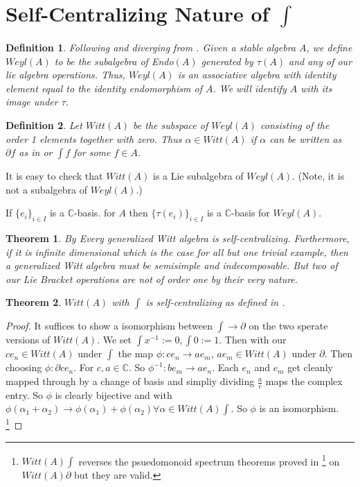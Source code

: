 \documentclass[10pt, oneside]{article}
\newcommand{\C}{\mathbb{C}}
\newtheorem{thm}{Theorem}
\newtheorem{defn}{Definition}
\begin{document}
\section{Self-Centralizing Nature of $\int$}
\begin{defn}
Following \cite{pakianathan2010generalizedwittalgebrasvariable} and diverging from \cite{Dokovic1998}. Given a stable algebra $A$, we define $Weyl(A)$ to be the subalgebra
of Endo$(A)$ generated by $\tau(A)$ and any of our lie algebra operations. Thus,
$Weyl(A)$ is an associative algebra with identity element equal to 
the identity endomorphism of $A$. We will identify $A$ with its image under $\tau$.
\end{defn}
\begin{defn}
Let $Witt(A)$ be the subspace of $Weyl(A)$ consisting of the order 1 elements
together with zero. Thus $\alpha \in Witt(A)$ if $\alpha$ can be written
as $\partial f$ as in \cite{pakianathan2010generalizedwittalgebrasvariable} or $\int f$ for some $f \in A$. 
\end{defn}

It is easy to check that $Witt(A)$ is a Lie subalgebra of $Weyl(A)$. (Note,
it is not a subalgebra of $Weyl(A)$.)

If $\{ e_i\}_{i \in I}$ is a $\C$-basis.
for $A$ then $\{ \tau(e_i) \}_{i \in I}$
is a $\C$-basis for $Weyl(A)$.
\begin{thm}
By \cite{pakianathan2010generalizedwittalgebrasvariable} Every generalized Witt algebra is self-centralizing. 
Furthermore, if it is infinite dimensional which is the case for all but one trivial example, then a generalized Witt algebra must be semisimple and 
indecomposable. But two of our Lie Bracket operations are not of order one by their very nature.
\end{thm}
\begin{thm}
   $Witt(A)$ with $\int$ is self-centralizing as defined in \cite{pakianathan2010generalizedwittalgebrasvariable}.
\end{thm}
\begin{proof}
   It suffices to show a isomorphism between $\int \to \partial$ on the two sperate versions of $Witt(A)$. We set $\int x^{-1} := 0, \int 0 := 1$. Then with our $c e_n \in Witt(A)$ under $\int$ the map $\phi: c e_n \to a e_m$, $a e_m \in Witt(A)$ under $\partial$. Then choosing $\phi: \partial c e_n$. For $c, a \in \C$. So $\phi^{-1}: b e_m \to a e_{n}$. 
   Each $e_n$ and $e_m$ get cleanly mapped through by a change of basis and simpliy dividing $\frac{a}{c}$ maps the complex entry. So $\phi$ is clearly bijective and with $\phi(\alpha_1 + \alpha_2) \to \phi(\alpha_1)+ \phi(\alpha_2) \forall \alpha \in Witt(A) \int$. So $\phi$ is an isomorphism.
   \footnote{$Witt(A) \int$ reverses the psuedomonoid spectrum theorems proved in \cite{pakianathan2010generalizedwittalgebrasvariable} \footnote{The sprectrum theorems in \cite{pakianathan2010generalizedwittalgebrasvariable} were proved so generally on $Witt(A)$ they cleanly map.} on $Witt(A) \partial$ but they are valid.} 
\end{proof}
\end{document}
